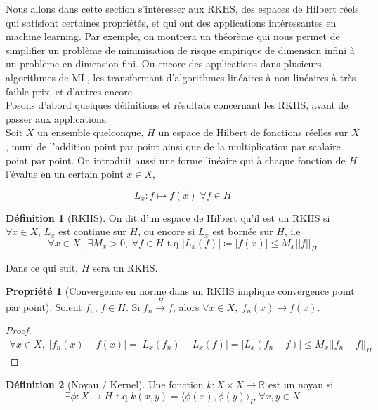 \documentclass[a4paper, 11pt, french]{article}
\theoremstyle{definition}
\newtheorem{definition}{Définition}
\newtheorem{property}{Propriété}
\begin{document}
	Nous allons dans cette section s'intéresser aux RKHS, des espaces de Hilbert réels qui satisfont certaines propriétés, et qui ont des applications intéressantes en machine learning. Par exemple, on montrera un théorème qui nous permet de simplifier un problème de minimisation de risque empirique de dimension infini à un problème en dimension fini. Ou encore des applications dans plusieurs algorithmes de ML, les transformant d'algorithmes linéaires à non-linéaires à très faible prix, et d'autres encore. \\
	
	Posons d'abord quelques définitions et résultats concernant les RKHS, avant de passer aux applications.
	\\
	
	Soit $X$ un ensemble quelconque, $H$ un espace de Hilbert de fonctions réelles sur $X$, muni de l'addition point par point ainsi que de la multiplication par scalaire point par point. On introduit aussi une forme linéaire qui à chaque fonction de $H$ l'évalue en un certain point $x \in X$,
	
	\[L_x : f \mapsto f(x) \; \forall f \in H\]
		
	\begin{definition}[RKHS]
		On dit d'un espace de Hilbert qu'il est un RKHS si $\forall x \in X$, $L_x$ est continue sur $H$, ou encore si $L_x$ est bornée sur $H$, i.e
		\[\forall x \in X, \;  \exists M_x > 0, \; \forall f \in H \text{ t.q } |L_x(f)| \coloneqq |f(x)| \leq M_x ||f||_H\]
	\end{definition}

	Dans ce qui suit, $H$ sera un RKHS.

	\begin{property}[Convergence en norme dans un RKHS implique convergence point par point]
		Soient $f_n, \, f \in H$. Si $f_n \stackrel{H}{\to} f$, alors $\forall x \in X, \; f_n(x) \to f(x)$.
	\end{property}
	\begin{proof}
		\begin{align*}
			\forall x \in X, \; |f_n(x) - f(x)| = |L_x(f_n) - L_x(f)| = |L_x(f_n - f)| \leq M_x||f_n - f||_H
		\end{align*}
	\end{proof}

	\begin{definition}[Noyau / Kernel]
		Une fonction $k : X \times X \to \mathbb{R}$ est un noyau si
		\[ \exists \phi : X \to H \text{ t.q } k(x,y) = \langle \phi (x), \phi(y) \rangle_H \; \forall x,y \in X \]
	\end{definition}
\end{document}
